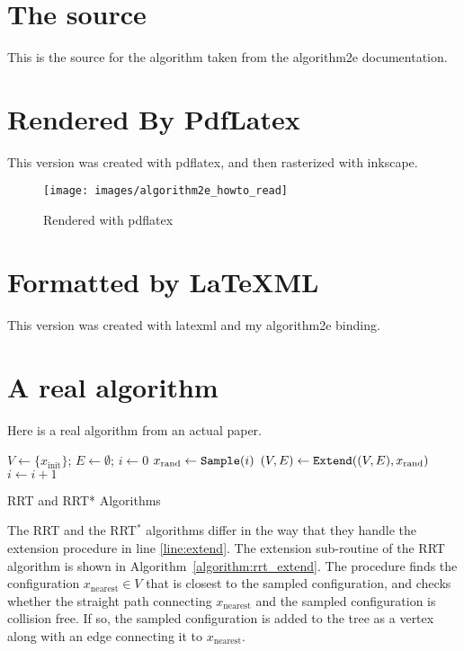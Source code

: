 \documentclass{article}
\begin{document}
\section{The source}

This is the source for the algorithm taken from the algorithm2e documentation.


 
\section{Rendered By PdfLatex}

This version was created with pdflatex, and then rasterized with inkscape.
 
\begin{center}
\begin{figure}[h]
    \texttt{[image: images/algorithm2e\_howto\_read]}
    \caption{Rendered with pdflatex}
\end{figure}
\end{center}

\section{Formatted by LaTeXML}

This version was created with latexml and my algorithm2e binding.



\section{A real algorithm}

Here is a real algorithm from an actual paper.


\begin{algorithm}[t] \small
  $V \leftarrow \{ x_\mathrm{init}\}$; $E \leftarrow \emptyset$; $i\leftarrow 0$\; \label{line:initial}
   { \label{line:iteration_start}
    $x_\mathrm{rand} \leftarrow {\tt Sample}(i)$\;  \label{line:sample} 
    $(V, E)\leftarrow {\tt Extend}((V,E),x_\mathrm{rand})$\;  \label{line:extend}
    $i \leftarrow i + 1$\; \label{line:iteration_end}
  }
  \caption{RRT and RRT* Algorithms}
  \label{algorithm:RRT_body}
\end{algorithm}

The RRT and the RRT$^*$ algorithms differ in the way that they handle the extension procedure in line \ref{line:extend}.
%
The extension sub-routine of the RRT algorithm is shown in Algorithm~\ref{algorithm:rrt_extend}. 
%
The procedure finds the configuration $x_\mathrm{nearest} \in V$ that is closest to the sampled configuration, and checks whether the straight path connecting $x_\mathrm{nearest}$ and the sampled configuration is collision free. If so, the sampled configuration is added to the tree as a vertex along with an edge connecting it to $x_\mathrm{nearest}$.
\end{document}
